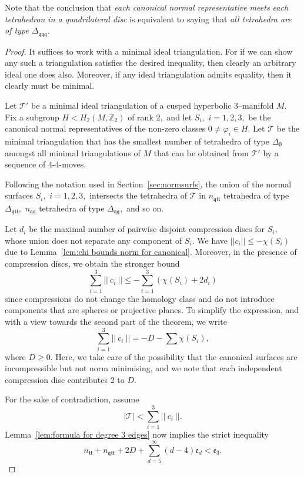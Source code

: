 \documentclass[a4paper]{gtart}
\def\tri{\mathcal{T}}
\def\manifold{M}
\def\Z{\mathbb{Z}}
\def\Tee{\Delta_{\emptyset}}
\def\Tqtt{\Delta_{\mathfrak{qtt}}}
\def\Tqq{\Delta_{\mathfrak{qq}}}
\def\Tqqq{\Delta_{\mathfrak{qqq}}}
\def\even{\mathfrak{e}}
\def\ntt{n_{\mathfrak{tt}}}
\def\nqtt{n_{\mathfrak{qtt}}}
\def\nqq{n_{\mathfrak{qq}}}
\theoremstyle{plain}
\theoremstyle{definition}
\theoremstyle{remark}
\numberwithin{equation}{section}
\begin{document}
Note that the conclusion that  \emph{each canonical normal representative meets each tetrahedron in a quadrilateral disc} is equivalent to saying that \emph{all tetrahedra are of type $\Tqqq$}.
  
\begin{proof}
It suffices to work with a minimal ideal triangulation. For if we can show any such a triangulation satisfies the desired inequality, then clearly an arbitrary ideal one does also. Moreover, if any ideal triangulation admits equality, then it clearly must be minimal.

Let $\tri'$ be a minimal ideal triangulation of a cusped hyperbolic 3--manifold $\manifold.$ Fix a subgroup $H< H_2 (\manifold,\Z_2)$ of rank $2,$ and let $S_i,$ $i=1,2,3,$ be the canonical normal representatives  of the non-zero classes  $0 \neq \varphi_i \in H.$ Let $\tri$ be the minimal triangulation that
has the smallest number of tetrahedra of type $\Tee$ amongst all minimal triangulations of $\manifold$ that can be obtained from $\tri'$ by a sequence of 4-4-moves.

Following the notation used in Section~\ref{sec:normsurfs}, the union of the normal surfaces $S_i,$ $ i = 1,2,3,$ intersects the tetrahedra of $\tri$ in $\nqtt$ tetrahedra of type $\Tqtt,$ $\nqq$ tetrahedra of type $\Tqq,$ and so on. 

Let $d_i$ be the maximal number of pairwise disjoint compression discs for $S_i$, whose union does not separate any component
of $S_i.$
We have $|| c_i || \leq - \chi (S_i)$ due to Lemma~\ref{lem:chi bounds norm for canonical}. Moreover, in the presence of compression discs, we obtain the stronger bound 
\[ \sum \limits_{i=1}^{3} ||\ c_i\ || \le - \sum \limits_{i=1}^{3} (\chi(S_i) +2d_i)\]
since compressions do not change the homology class and do not introduce components that are spheres or projective planes.
To simplify the expression, and with a view towards the second part of the theorem, we write 
\[\sum \limits_{i=1}^{3} ||\ c_i\ ||  = -D - \sum \chi(S_i),\]
where $D\ge 0.$ Here, we take care of the possibility that the canonical surfaces are incompressible but not norm minimising, and we note that each independent compression disc contributes 2 to $D.$

For the sake of contradiction, assume
\[|\tri| < \sum \limits_{i=1}^{3} ||\ c_i\ ||.\]
Lemma~\ref{lem:formula for degree 3 edges} now implies the strict inequality
\begin{equation}
  \label{eq:main}
  \ntt+\nqtt+2 D+\sum_{d=5}^{\infty} (d-4) \even_d < \even_3.
\end{equation}


\end{proof}
\end{document}
